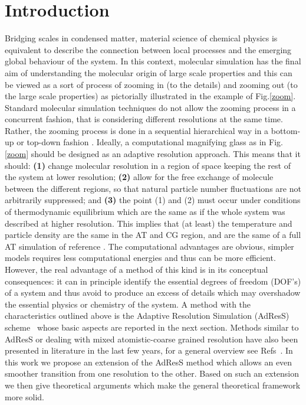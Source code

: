 \documentclass[aps,prb,preprint,citeautoscript]{revtex4}
\newcommand{\recheck}[1]{{\color{black} #1}}
\begin{document}
\section{Introduction}
Bridging scales in condensed matter, material science of chemical physics is equivalent to describe the connection between local processes and the emerging global behaviour of the system. In this context, molecular simulation has the final aim of understanding the molecular origin of large scale properties and this can be viewed as a sort of process of zooming in (to the details) and zooming out (to the large scale properties) as pictorially illustrated in the example of Fig.\ref{zoom}. Standard molecular simulation techniques do not allow the zooming process in a concurrent fashion, that is considering different resolutions at the same time. Rather, the zooming process is done in a sequential hierarchical way in a bottom-up or top-down fashion \cite{annurev}. Ideally, a computational magnifying glass as in Fig.\ref{zoom} should be designed as an adaptive resolution approach. This means that it should: {\bf (1)} change molecular resolution in a region of space keeping the rest of the system at lower resolution; {\bf (2)} allow for the free exchange of molecule between the different regions, so that natural particle number fluctuations  are not arbitrarily suppressed; and {\bf (3)} the point (1) and (2) must occur under conditions of thermodynamic equilibrium which are the same as if the whole system was described at higher resolution.
This implies that (at least) the temperature and particle density are the same in the AT and CG region, and are the same of a full AT simulation of reference \cite{annurev}. The computational advantages are obvious, simpler models requires less computational energies and thus can be more efficient. However, the real advantage of a method of this kind is in its conceptual consequences: it can in principle identify the essential degrees of freedom (DOF's) of a system and thus avoid to produce an excess of details which may overshadow the essential physics or chemistry of the system. A method with the characteristics outlined above is the Adaptive Resolution Simulation (AdResS) scheme~\cite{jcp,pre} whose basic aspects are reported in the next section. \recheck{Methods similar to AdResS or dealing with mixed atomistic-coarse grained resolution have also been presented in literature in the last few years, for a general overview see} Refs~\cite{klein,heyden,voth1,voth2,ensingprl,prlcomm}. In this work we propose an extension of the AdResS method which allows an even smoother transition from one resolution to the other. Based on such an extension we then give theoretical arguments which make the general theoretical framework more solid.
\end{document}
